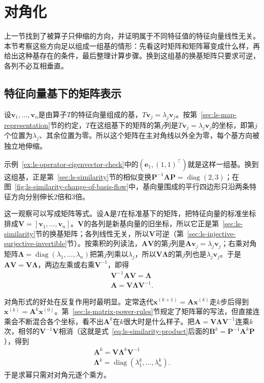 
\section{对角化}
\label{sec:ls-matrix-powers}
\label{sec:ch06-powers-spectrum}

上一节找到了被算子只伸缩的方向，并证明属于不同特征值的特征向量线性无关。本节考察这些方向足以组成一组基的情形：先看这时矩阵和矩阵幂变成什么样，再给出这种基存在的条件，最后整理计算步骤。换到这组基的换基矩阵只要求可逆，各列不必互相垂直。

\subsection{特征向量基下的矩阵表示}
\label{sec:matrix-analysis-spectrum}

设$\bm v_1,\ldots,\bm v_n$是由算子$T$的特征向量组成的基，$T\bm v_j=\lambda_j\bm v_j$。按第~\ref{sec:ls-map-representation}节的约定，$T$在这组基下的矩阵的第$j$列是$T\bm v_j=\lambda_j\bm v_j$的坐标，即第$j$个位置为$\lambda_j$、其余位置为零。所以这个矩阵在主对角线以外全为零，每个基方向被独立地伸缩。

示例~\ref{ex:ls-operator-eigenvector-check}中的$(\bm e_1,(1,1)^{\top})$就是这样一组基。换到这组基，正是第~\ref{sec:ls-similarity}节的相似变换$\bm P^{-1}\bm A\bm P=\operatorname{diag}(2,3)$；在图~\ref{fig:ls-similarity-change-of-basis-flow}中，基向量围成的平行四边形只沿两条特征方向分别伸长$2$倍和$3$倍。

这一观察可以写成矩阵等式。设$\bm A$是$T$在标准基下的矩阵，把特征向量的标准坐标排成$\bm V=[\bm v_1,\ldots,\bm v_n]$。$\bm V$的各列是新基向量的旧坐标，所以它正是第~\ref{sec:ls-similarity}节的换基矩阵；各列线性无关，所以$\bm V$可逆（第~\ref{sec:ls-injective-surjective-invertible}节）。按乘积的列读法，$\bm A\bm V$的第$j$列是$\bm A\bm v_j=\lambda_j\bm v_j$；右乘对角矩阵$\bm\Lambda=\operatorname{diag}(\lambda_1,\ldots,\lambda_n)$把第$j$列乘以$\lambda_j$，所以$\bm V\bm\Lambda$的第$j$列也是$\lambda_j\bm v_j$。于是$\bm A\bm V=\bm V\bm\Lambda$，两边左乘或右乘$\bm V^{-1}$，即得
\[
 \begin{gathered}
\bm V^{-1}\bm A\bm V=\bm\Lambda\\
\bm A=\bm V\bm\Lambda\bm V^{-1}.
 \end{gathered}
\]

对角形式的好处在反复作用时最明显。定常迭代$\bm x^{(k+1)}=\bm A\bm x^{(k)}$走$k$步后得到$\bm x^{(k)}=\bm A^k\bm x^{(0)}$。第~\ref{sec:ls-matrix-power-rules}节规定了矩阵幂的写法，但直接连乘会不断混合各个坐标，看不出$\bm A^k$在$k$很大时是什么样子。把$\bm A=\bm V\bm\Lambda\bm V^{-1}$连乘$k$次，相邻的$\bm V^{-1}\bm V$相消（这就是式~\eqref{eq:ls-similarity-product}后面的$\bm B^k=\bm P^{-1}\bm A^k\bm P$），得到
\begin{equation}
\begin{gathered}
\bm A^k=\bm V\bm\Lambda^k\bm V^{-1}\\
\bm\Lambda^k=\operatorname{diag}(\lambda_1^k,\ldots,\lambda_n^k).
\end{gathered}
\label{eq:ls-diagonalization-power}
\end{equation}
于是求幂只需对对角元逐个乘方。


